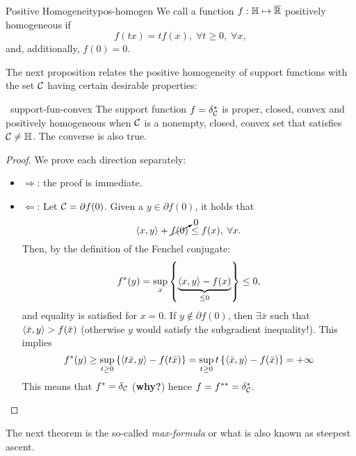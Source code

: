 \begin{cdefinition}{Positive Homogeneity}{pos-homogen}
    We call a function $f: \mathbb{H} \mapsto \overline{\mathbb{R}}$ positively homogeneous
    if
    \[
        f(tx) = tf(x), \; \forall t \geq 0, \; \forall x,
    \]
    and, additionally, $f(0) = 0$.
\end{cdefinition}
The next proposition relates the positive homogeneity of support functions with
the set $\mathcal{C}$ having certain desirable properties:
\begin{cproposition}{~}{support-fun-convex}
    The support function $f = \delta_{\mathcal{C}}^*$ is proper, closed, convex and
    positively homogeneous when $\mathcal{C}$ is a nonempty, closed, convex set that
    satisfies $\mathcal{C} \neq \mathbb{H}$. The converse is also true.
\end{cproposition}
\begin{proof}
    We prove each direction separately:
    \begin{itemize}
    \item $\Rightarrow$: the proof is immediate. 
    \item $\Leftarrow$: Let $\mathcal{C} = \partial f(0)$. Given a $y \in \partial
    f(0)$, it holds that
    \[
        \left\langle x, y \right\rangle + \cancelto{0}{f(0)} \leq f(x), \; \forall x.
    \]
    Then, by the definition of the Fenchel conjugate:
    \[
        f^*(y) = \sup_{x} \left\{ \underbrace{\left\langle x, y \right\rangle - f(x)}_{\leq 0} \right\}
        \leq 0,
    \]
    and equality is satisfied for $x = 0$. If $y \notin \partial f(0)$, then
    $\exists \bar{x}$ such that $\left\langle \bar{x}, y \right\rangle > f(\bar{x})$ (otherwise $y$
    would satisfy the subgradient inequality!). This implies
    \[
        f^*(y) \geq \sup_{t \geq 0} \left\{ \left\langle t\bar{x}, y \right\rangle - f(t \bar{x}) \right\}
        = \sup_{t \geq 0} t \left\{ \left\langle \bar{x}, y \right\rangle - f(\bar{x}) \right\} = +\infty
    \]
    This means that $f^* = \delta_{\mathcal{C}}$ (\textbf{why?}) hence $f = f^{**} =
    \delta_{\mathcal{C}}^*$.
    \end{itemize}
\end{proof}
The next theorem is the so-called \textit{max-formula} or what is also known as
steepest ascent.

